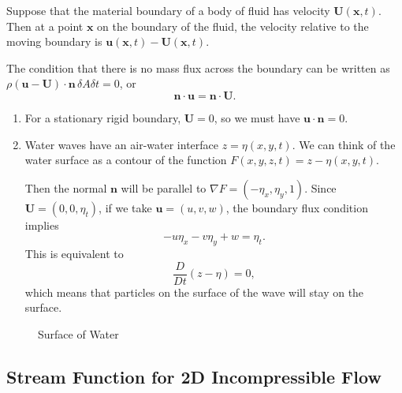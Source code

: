 \documentclass[12pt]{article}
\begin{document}
Suppose that the material boundary of a body of fluid has velocity $\mathbf{U}(\mathbf{x},t)$. Then at a point $\mathbf{x}$ on the boundary of the fluid, the velocity relative to the moving boundary is $\mathbf{u}(\mathbf{x}, t) - \mathbf{U}(\mathbf{x}, t)$.

The condition that there is no mass flux across the boundary can be written as $\rho (\mathbf{u} - \mathbf{U}) \cdot \mathbf{n} \, \delta A \delta t=  0$, or
\[
\mathbf{n} \cdot \mathbf{u} = \mathbf{n} \cdot \mathbf{U}
.\]

\begin{exbox}
	\begin{enumerate}
		\item For a stationary rigid boundary, $\mathbf{U} = 0$, so we must have $\mathbf{u} \cdot \mathbf{n} = 0$.
		\item Water waves have an air-water interface $z = \eta(x, y, t)$. We can think of the water surface as a contour of the function $F(x, y, z, t) = z - \eta(x, y, t)$.

			Then the normal $\mathbf{n}$ will be parallel to $\nabla F = (-\eta_x, \eta_y, 1)$. Since $\mathbf{U} = (0, 0, \eta_t)$, if we take $\mathbf{u} = (u, v, w)$, the boundary flux condition implies
			\[
			- u \eta_x - v \eta_y + w = \eta_t
			.\]
			This is equivalent to
			\[
			\frac{D}{Dt}(z - \eta) = 0
			,\]
			which means that particles on the surface of the wave will stay on the surface.
	\end{enumerate}
\end{exbox}

\begin{figure}[h]
	\centering
	\caption{Surface of Water}
	\label{fig:water_surface}
\end{figure}

\subsection{Stream Function for 2D Incompressible Flow}
\label{sub:stream_function_for_2d_incompressible_flow}
\end{document}
